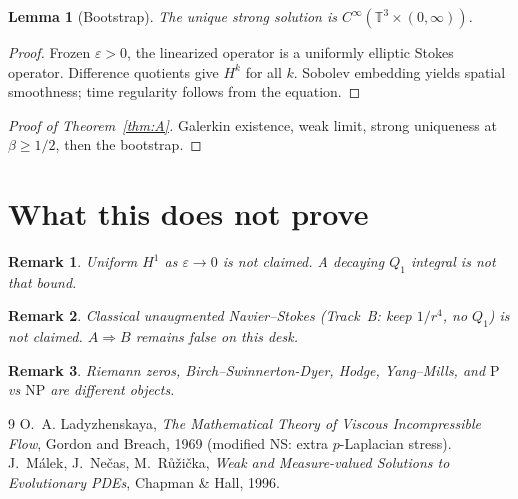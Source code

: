 \documentclass[11pt]{article}
\newtheorem{lemma}{Lemma}
\newtheorem{remark}{Remark}
\begin{document}
\begin{lemma}[Bootstrap]
The unique strong solution is
\(C^\infty(\mathbb{T}^3\times(0,\infty))\).
\end{lemma}

\begin{proof}
Frozen \(\varepsilon>0\), the linearized operator is a
uniformly elliptic Stokes operator. Difference quotients
give \(H^k\) for all \(k\). Sobolev embedding yields
spatial smoothness; time regularity follows from the
equation.
\end{proof}

\begin{proof}[Proof of Theorem~\ref{thm:A}]
Galerkin existence, weak limit, strong uniqueness at
\(\beta\ge 1/2\), then the bootstrap.
\end{proof}

\section{What this does not prove}

\begin{remark}
Uniform \(H^1\) as \(\varepsilon\to 0\) is not claimed.
A decaying \(Q_1\) integral is not that bound.
\end{remark}

\begin{remark}
Classical unaugmented Navier--Stokes (Track~B: keep
\(1/r^4\), no \(Q_1\)) is not claimed.
\(A\Rightarrow B\) remains false on this desk.
\end{remark}

\begin{remark}
Riemann zeros, Birch--Swinnerton-Dyer, Hodge, Yang--Mills,
and \(\mathrm{P}\) vs \(\mathrm{NP}\) are different objects.
\end{remark}

\begin{thebibliography}{9}
O.~A. Ladyzhenskaya,
\textit{The Mathematical Theory of Viscous Incompressible Flow},
Gordon and Breach, 1969
(modified NS: extra \(p\)-Laplacian stress).
J.~M\'alek, J.~Ne\v{c}as, M.~R\r{u}\v{z}i\v{c}ka,
\textit{Weak and Measure-valued Solutions to Evolutionary PDEs},
Chapman \& Hall, 1996.
\end{thebibliography}
\end{document}
